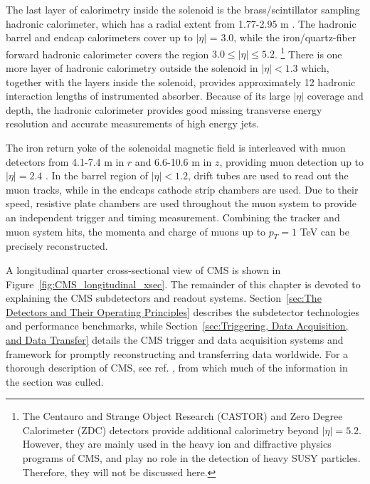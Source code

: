 \documentclass[dissertation.tex]{subfiles}
\begin{document}
The last layer of calorimetry inside the solenoid is the brass/scintillator sampling hadronic calorimeter, which has a radial extent from 1.77-2.95 m \cite{CMS_detector_paper}.  The hadronic barrel and endcap calorimeters cover up to $|\eta|$ = 3.0, while the iron/quartz-fiber forward hadronic calorimeter covers the region $3.0 \leq |\eta| \leq 5.2$. \footnote{The Centauro and Strange Object Research (CASTOR) and Zero Degree Calorimeter (ZDC) detectors provide additional calorimetry beyond $|\eta| = 5.2$.  However, they are mainly used in the heavy ion and diffractive physics programs of CMS, and play no role in the detection of heavy SUSY particles.  Therefore, they will not be discussed here.}  There is one more layer of hadronic calorimetry outside the solenoid in $|\eta| < 1.3$ which, together with the layers inside the solenoid, provides approximately 12 hadronic interaction lengths of instrumented absorber.  Because of its large $|\eta|$ coverage and depth, the hadronic calorimeter provides good missing transverse energy resolution and accurate measurements of high energy jets.

The iron return yoke of the solenoidal magnetic field is interleaved with muon detectors from 4.1-7.4 m in $r$ and 6.6-10.6 m in $z$, providing muon detection up to $|\eta| = 2.4$ \cite{CMS_detector_paper}.  In the barrel region of $|\eta| < 1.2$, drift tubes are used to read out the muon tracks, while in the endcaps cathode strip chambers are used.  Due to their speed, resistive plate chambers are used throughout the muon system to provide an independent trigger and timing measurement.  Combining the tracker and muon system hits, the momenta and charge of muons up to $p_{T} = 1$ TeV can be precisely reconstructed.

A longitudinal quarter cross-sectional view of CMS is shown in Figure~\ref{fig:CMS_longitudinal_xsec}.  The remainder of this chapter is devoted to explaining the CMS subdetectors and readout systems.  Section~\ref{sec:The Detectors and Their Operating Principles} describes the subdetector technologies and performance benchmarks, while Section~\ref{sec:Triggering, Data Acquisition, and Data Transfer} details the CMS trigger and data acquisition systems and framework for promptly reconstructing and transferring data worldwide.  For a thorough description of CMS, see ref. \cite{CMS_detector_paper}, from which much of the information in the section was culled.
\end{document}
